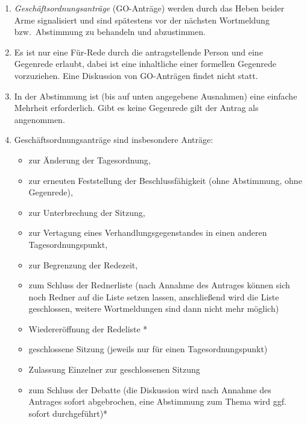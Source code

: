 \documentclass[draft,12pt,oneside]{scrreprt}
\begin{document}
\begin{enumerate}
  \item \textit{Geschäftsordnungsanträge} (GO-Anträge) werden durch das Heben
        beider Arme signalisiert und sind spätestens vor der nächsten Wortmeldung
        bzw.\ Abstimmung zu behandeln und abzustimmen.

  \item Es ist nur eine Für-Rede durch die antragstellende Person und eine Gegenrede
        erlaubt, dabei ist eine inhaltliche einer formellen Gegenrede vorzuziehen.
        Eine Diskussion von GO-Anträgen findet nicht statt.

  \item In der Abstimmung ist (bis auf unten angegebene Ausnahmen) eine einfache
        Mehrheit erforderlich.
        Gibt es keine Gegenrede gilt der Antrag als angenommen.

  \item Geschäftsordnungsanträge sind insbesondere Anträge:
    \begin{itemize}
      \item zur Änderung der Tagesordnung,

      \item zur erneuten Feststellung der Beschlussfähigkeit
            (ohne Abstimmung, ohne Gegenrede),

      \item zur Unterbrechung der Sitzung,

      \item zur Vertagung eines Verhandlungsgegenstandes in einen anderen
            Tagesordnungspunkt,

      \item zur Begrenzung der Redezeit,

      \item zum Schluss der Rednerliste (nach Annahme des Antrages können sich
            noch Redner auf die Liste setzen lassen, anschließend wird die Liste
            geschlossen, weitere Wortmeldungen sind dann nicht mehr möglich)

      \item Wiedereröffnung der Redeliste *

      \item geschlossene Sitzung (jeweils nur für einen Tagesordnungspunkt)

      \item Zulassung Einzelner zur geschlossenen Sitzung

      \item zum Schluss der Debatte (die Diskussion wird nach Annahme des
            Antrages sofort abgebrochen, eine Abstimmung zum Thema wird ggf.
            sofort durchgeführt)*


\end{itemize}
\end{enumerate}
\end{document}
